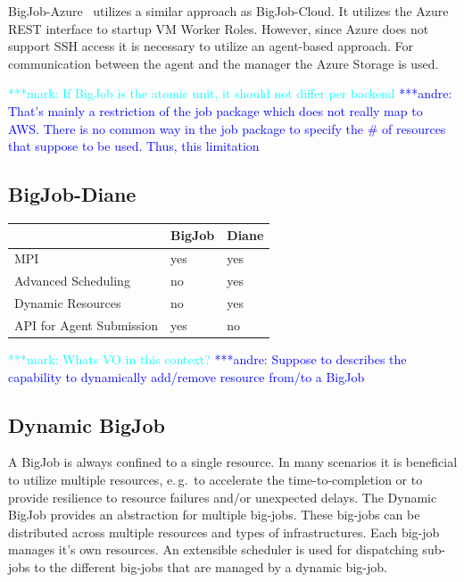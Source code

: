\documentclass[]{article}
\newcommand{\alnote}[1]{ {\textcolor{blue} { ***andre: #1 }}}
\newcommand{\msnote}[1]{ {\textcolor{cyan} { ***mark: #1 }}}
\newcommand{\alnote}[1]{}
\begin{document}
BigJob-Azure~\cite{10.1109/CloudCom.2010.85} utilizes a similar approach as
BigJob-Cloud. It utilizes the Azure REST interface to startup VM Worker Roles.
However, since Azure does not support SSH access it is necessary to utilize an
agent-based approach. For communication between the agent and the manager the
Azure Storage is used.

\msnote{If BigJob is the atomic unit, it should not differ per
backend}\alnote{That's mainly a restriction of the job package which does not
really map to AWS. There is no common way in the job package to specify the \#
of resources that suppose to be used. Thus, this limitation}


\subsection{BigJob-Diane}

\begin{tabular}{|l|l|l|}
\hline
 &BigJob &Diane\\
\hline
MPI &yes &yes\\
\hline
Advanced Scheduling &no &yes\\
\hline
Dynamic Resources &no &yes\\
\hline
API for Agent Submission &yes &no\\
\hline
\end{tabular}

\msnote{Whats VO in this context?}\alnote{Suppose to describes the capability to dynamically add/remove resource from/to a BigJob}



\subsection{Dynamic BigJob}

A BigJob is always confined to a single resource. In many scenarios it is
beneficial to utilize multiple resources, e.\,g.\ to accelerate the
time-to-completion or to provide resilience to resource failures and/or
unexpected delays. The Dynamic BigJob provides an abstraction for multiple
big-jobs. These big-jobs can be distributed across multiple resources and types
of infrastructures. Each big-job manages it's own resources. An extensible
scheduler is used for dispatching sub-jobs to the different big-jobs that are
managed by a dynamic big-job.

\end{document}
